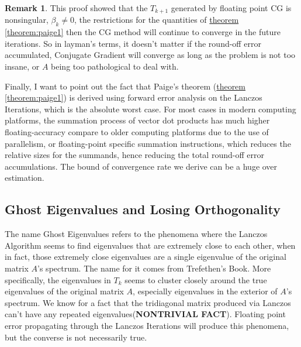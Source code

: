 \documentclass[]{article}
\theoremstyle{definition}
\newtheorem{remark}{Remark}[subsection]  %
\begin{document}
            \begin{remark}
                This proof showed that the $T_{k + 1}$ generated by floating point CG is nonsingular, $\beta_k \neq 0$, the restrictions for the quantities of \hyperref[theorem:paige1]{theorem \ref*{theorem:paige1}} then the CG method will continue to converge in the future iterations. So in layman's terms, it doesn't matter if the round-off error accumulated, Conjugate Gradient will converge as long as the problem is not too insane, or $A$ being too pathological to deal with. 
                \par
                Finally, I want to point out the fact that Paige's theorem (\hyperref[theorem:paige1]{theorem \ref*{theorem:paige1}}) is derived using forward error analysis on the Lanczos Iterations, which is the absolute worst case. For most cases in modern computing platforms, the summation process of vector dot products has much higher floating-accuracy compare to older computing platforms due to the use of parallelism, or floating-point specific summation instructions, which reduces the relative sizes for the summands, hence reducing the total round-off error accumulations. The bound of convergence rate we derive can be a huge over estimation. 
            \end{remark}

    \subsection{Ghost Eigenvalues and Losing Orthogonality}
        The name Ghost Eigenvalues refers to the phenomena where the Lanczos Algorithm seems to find eigenvalues that are extremely close to each other, when in fact, those extremely close eigenvalues are a single eigenvalue of the original matrix $A$'s spectrum. The name for it comes from Trefethen's Book\cite{book:trefethen}. More specifically, the eigenvalues in $T_k$ seems to cluster closely around the true eigenvalues of the original matrix $A$, especially eigenvalues in the exterior of $A$'s spectrum. We know for a fact that the tridiagonal matrix produced via Lanczos can't have any repeated eigenvalues(\textbf{NONTRIVIAL FACT}). Floating point error propagating through the Lanczos Iterations will produce this phenomena, but the converse is not necessarily true. 
\end{document}
